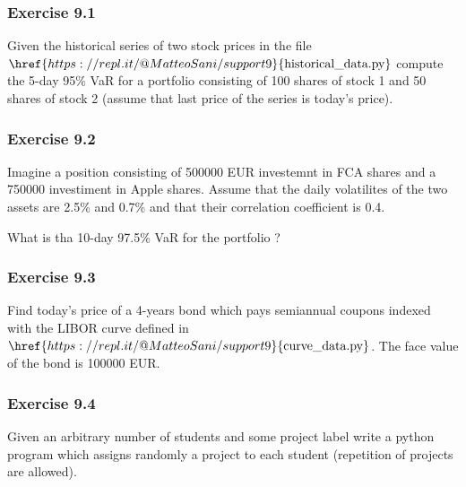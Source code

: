 \hypertarget{exercise-9.1}{%
\subsubsection{Exercise 9.1}\label{exercise-9.1}}

Given the historical series of two stock prices in the file
\(\href{https://repl.it/@MatteoSani/support9}{\textrm{historical\_data.py}}\)
compute the 5-day 95\% VaR for a portfolio consisting of 100 shares of
stock 1 and 50 shares of stock 2 (assume that last price of the series
is today's price).

\hypertarget{exercise-9.2}{%
\subsubsection{Exercise 9.2}\label{exercise-9.2}}

Imagine a position consisting of 500000 EUR investemnt in FCA shares and
a 750000 investiment in Apple shares. Assume that the daily volatilites
of the two assets are 2.5\% and 0.7\% and that their correlation
coefficient is 0.4.

What is tha 10-day 97.5\% VaR for the portfolio ?

\hypertarget{exercise-9.3}{%
\subsubsection{Exercise 9.3}\label{exercise-9.3}}
Find today's price of a 4-years bond which pays semiannual coupons indexed with the LIBOR curve defined in \(\href{https://repl.it/@MatteoSani/support9}{\textrm{curve\_data.py}}\). The face value of the bond is 100000 EUR.

\hypertarget{exercise-9.4}{%
\subsubsection{Exercise 9.4}\label{exercise-9.4}}

Given an arbitrary number of students and some project label
write a python program which assigns randomly a project to each student
(repetition of projects are allowed).

